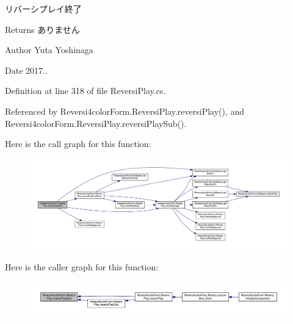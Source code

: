 リバーシプレイ終了 

\begin{DoxyReturn}{Returns}
ありません 
\end{DoxyReturn}
\begin{DoxyAuthor}{Author}
Yuta Yoshinaga 
\end{DoxyAuthor}
\begin{DoxyDate}{Date}
2017.. 
\end{DoxyDate}


Definition at line 318 of file Reversi\+Play.\+cs.



Referenced by Reversi4color\+Form.\+Reversi\+Play.\+reversi\+Play(), and Reversi4color\+Form.\+Reversi\+Play.\+reversi\+Play\+Sub().

Here is the call graph for this function\+:
\nopagebreak
\begin{figure}[H]
\begin{center}
\leavevmode
\includegraphics[width=350pt]{class_reversi4color_form_1_1_reversi_play_a79053272ed2b985de79154b105c46c15_cgraph}
\end{center}
\end{figure}
Here is the caller graph for this function\+:
\nopagebreak
\begin{figure}[H]
\begin{center}
\leavevmode
\includegraphics[width=350pt]{class_reversi4color_form_1_1_reversi_play_a79053272ed2b985de79154b105c46c15_icgraph}
\end{center}
\end{figure}
\mbox{\label{class_reversi4color_form_1_1_reversi_play_a47c3f277e5f480d6a5af1ca7b3a667f4}} 
